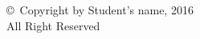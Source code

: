 \newpage
{}
\vspace*{15 cm}

\begin{center}
{\large \copyright \, Copyright by Student's name, 2016 \\ All Right Reserved}
\end{center}
